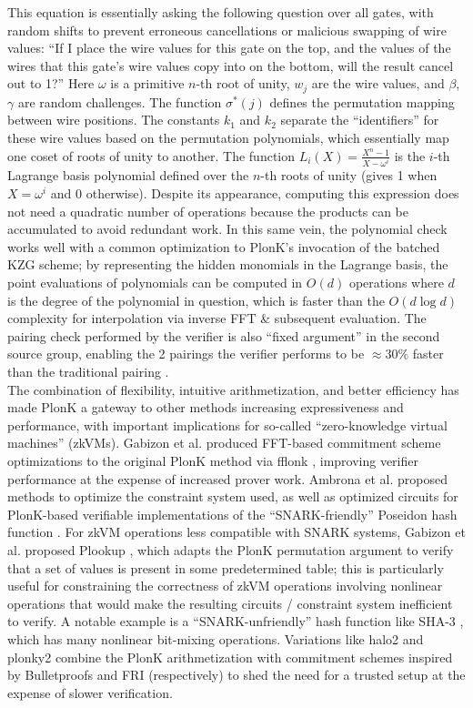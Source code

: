 \noindent This equation is essentially asking the following question over all gates, with random shifts to prevent erroneous cancellations or malicious swapping of wire values: ``If I place the wire values for this gate on the top, and the values of the wires that this gate's wire values copy into on the bottom, will the result cancel out to 1?'' Here $\omega$ is a primitive $n$-th root of unity, $w_j$ are the wire values, and $\beta$, $\gamma$ are random challenges. The function $\sigma^*(j)$ defines the permutation mapping between wire positions. The constants $k_1$ and $k_2$ separate the ``identifiers'' for these wire values based on the permutation polynomials, which essentially map one coset of roots of unity to another. The function $L_i(X) = \frac{X^n - 1}{X - \omega^i}$ is the $i$-th Lagrange basis polynomial defined over the $n$-th roots of unity (gives 1 when $X = \omega^i$ and 0 otherwise). Despite its appearance, computing this expression does not need a quadratic number of operations because the products can be accumulated to avoid redundant work. In this same vein, the polynomial check works well with a common optimization to PlonK's invocation of the batched KZG scheme; by representing the hidden monomials in the Lagrange basis, the point evaluations of polynomials can be computed in $O(d)$ operations where $d$ is the degree of the polynomial in question, which is faster than the $O(d \log d)$ complexity for interpolation via inverse FFT \& subsequent evaluation. The pairing check performed by the verifier is also ``fixed argument'' in the second source group, enabling the 2 pairings the verifier performs to be $\approx30\%$ faster than the traditional pairing \cite{fapairings}.\\

\noindent The combination of flexibility, intuitive arithmetization, and better efficiency has made PlonK a gateway to other methods increasing expressiveness and performance, with important implications for so-called ``zero-knowledge virtual machines'' (zkVMs). Gabizon et al. produced FFT-based commitment scheme optimizations to the original PlonK method via fflonk \cite{fflonk}, improving verifier performance at the expense of increased prover work. Ambrona et al. \cite{turboplonk} proposed methods to optimize the constraint system used, as well as optimized circuits for PlonK-based verifiable implementations of the ``SNARK-friendly'' Poseidon hash function \cite{poseidon}. For zkVM operations less compatible with SNARK systems, Gabizon et al. proposed Plookup \cite{plookup}, which adapts the PlonK permutation argument to verify that a set of values is present in some predetermined table; this is particularly useful for constraining the correctness of zkVM operations involving nonlinear operations that would make the resulting circuits / constraint system inefficient to verify. A notable example is a ``SNARK-unfriendly'' hash function like SHA-3 \cite{sha3}, which has many nonlinear bit-mixing operations. Variations like halo2 \cite{halo2} and plonky2 \cite{plonky2} combine the PlonK arithmetization with commitment schemes inspired by Bulletproofs \cite{bulletproofs} and FRI \cite{fri} (respectively) to shed the need for a trusted setup at the expense of slower verification. \\

